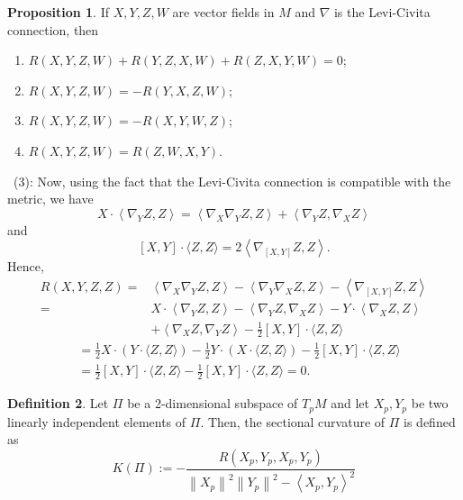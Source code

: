 \documentclass[12pt,a4paper]{book}
\newenvironment{prooff}{{\noindent\it\textcolor{cyan!40!black}{Proof}:}\,}{\par}
\newenvironment{enu}{\begin{enumerate}[(1)]}{\end{enumerate}}
\theoremstyle{definition}
\newtheorem{defn}{Definition}[section]
\newtheorem{prop}[defn]{Proposition}
\begin{document}
\begin{prop}
    If $X, Y, Z, W$ are vector fields in $M$ and $\nabla$ is the Levi-Civita connection, then
    \begin{enu}
        \item $R(X, Y, Z, W)+R(Y, Z, X, W)+R(Z, X, Y, W)=0$;
        \item $R(X, Y, Z, W)=-R(Y, X, Z, W)$;
        \item $R(X, Y, Z, W)=-R(X, Y, W, Z)$;
        \item $R(X, Y, Z, W)=R(Z, W, X, Y)$.
    \end{enu}
    \label{proposition: symmetric prop}
\end{prop}
\begin{prooff}
    (3):  Now, using the fact that the Levi-Civita connection is compatible with the metric, we have
    $$
        X \cdot\left\langle\nabla_Y Z, Z\right\rangle=\left\langle\nabla_X \nabla_Y Z, Z\right\rangle+\left\langle\nabla_Y Z, \nabla_X Z\right\rangle
    $$
    and
    $$
        [X, Y] \cdot\langle Z, Z\rangle=2\left\langle\nabla_{[X, Y]} Z, Z\right\rangle .
    $$
    Hence,
    $$
        \begin{aligned}
            R(X, Y, Z, Z)= & \left\langle\nabla_X \nabla_Y Z, Z\right\rangle-\left\langle\nabla_Y \nabla_X Z, Z\right\rangle-\left\langle\nabla_{[X, Y]} Z, Z\right\rangle \\
            =              & X \cdot\left\langle\nabla_Y Z, Z\right\rangle-\left\langle\nabla_Y Z, \nabla_X Z\right\rangle-Y \cdot\left\langle\nabla_X Z, Z\right\rangle   \\
                           & +\left\langle\nabla_X Z, \nabla_Y Z\right\rangle-\frac{1}{2}[X, Y] \cdot\langle Z, Z\rangle
        \end{aligned}
    $$
    $$
        \begin{aligned}
             & =\frac{1}{2} X \cdot(Y \cdot\langle Z, Z\rangle)-\frac{1}{2} Y \cdot(X \cdot\langle Z, Z\rangle)-\frac{1}{2}[X, Y] \cdot\langle Z, Z\rangle \\
             & =\frac{1}{2}[X, Y] \cdot\langle Z, Z\rangle-\frac{1}{2}[X, Y] \cdot\langle Z, Z\rangle=0 .
        \end{aligned}
    $$
\end{prooff}
\begin{defn}
    Let $\Pi$ be a 2-dimensional subspace
    of $T_p M$ and let $X_p, Y_p$ be two linearly independent
    elements of $\Pi$. Then, the sectional curvature of $\Pi$ is defined as
    $$
        K(\Pi):=-\frac{R\left(X_p, Y_p, X_p, Y_p\right)}{\left\|X_p\right\|^2\left\|Y_p\right\|^2-\left\langle X_p, Y_p\right\rangle^2}
    $$
\end{defn}
\end{document}
